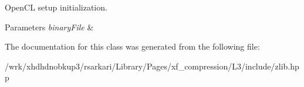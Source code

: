 Open\-C\-L setup initialization. 


\begin{DoxyParams}{Parameters}
{\em binary\-File} & \\
\hline
\end{DoxyParams}


The documentation for this class was generated from the following file\-:\begin{DoxyCompactItemize}
\item 
/wrk/xhdhdnobkup3/rsarkari/\-Library/\-Pages/xf\-\_\-compression/\-L3/include/zlib.\-hpp\end{DoxyCompactItemize}
